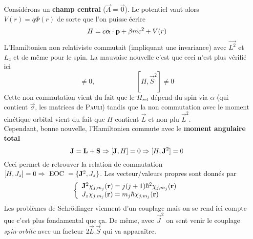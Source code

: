Considérons un \textbf{champ central} ($\vec{A}=\vec0$). Le potentiel vaut alors $V(r)=q\Phi(r)$ de
sorte que l'on puisse écrire
\begin{equation}
H = 
c  \mbox{\boldmath $ \alpha $} \cdot  {\bf p}
 + \beta m c^2 + V(r)
\end{equation}
L'Hamiltonien non relativiste commutait (impliquant une invariance) avec $\vec{L^2}$ et $L_z$ et de
même pour le spin. La mauvaise nouvelle c'est que ceci n'est plus vérifié ici
\begin{equation}
[H,\vec{L}^2] \neq 0,\qquad\qquad\qquad [H,\vec{S}^2] \neq 0
\end{equation}
Cette non-commutation vient du fait que le $H_{rel}$ dépend du spin via $\alpha$ (qui contient 
$\vec \sigma$, les matrices de \textsc{Pauli}) tandis que la non commutation avec le moment cinétique
orbital vient du fait que $H$ contient $\vec{L}$ et non plu $\vec{L}^2$.\\

Cependant, bonne nouvelle, l'Hamiltonien commute avec le \textbf{moment angulaire total}
\begin{equation}
{\bf J} = {\bf L} + {\bf S} \Rightarrow [ {\bf J}, H ] = 0
\Rightarrow [H, {\bf J}^2] = 0
\end{equation}
Ceci permet de retrouver la relation de commutation $[ H , J_z ] = 0 \Rightarrow ~\mbox{EOC}~ = \{
{\bf J}^2, J_z \}$. Les vecteur/valeurs propres sont donnés par 
\begin{equation}
 \left\{ \begin{array}{l}
{\bf J}^2 \chi_{j,m_j} ({\bf r}) = j(j+1) \hbar^2 \chi_{j,m_j} ({\bf r}) \\
J_z \chi_{j,m_j} ({\bf r}) = m_j \hbar \chi_{j,m_j} ({\bf r}) 
\end{array} \right.
\end{equation}
Les problèmes de Schrödinger viennent d'un couplage mais on se rend ici compte que c'est plus 
fondamental que ça. De même, avec $\vec{J}^2$ on sent venir le couplage \textit{spin-orbite} avec
un facteur $2\vec{L}.\vec{S}$ qui va apparaître.\\

